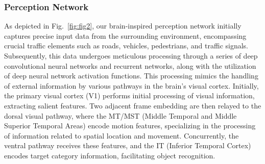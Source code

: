 \subsubsection{Perception Network}
\hspace{1pc}As depicted in Fig.~\ref{fig:fig2}, our brain-inspired perception network initially captures precise input data from the surrounding environment, encompassing crucial traffic elements such as roads, vehicles, pedestrians, and traffic signals. 
Subsequently, this data undergoes meticulous processing through a series of deep convolutional neural networks and recurrent networks, along with the utilization of deep neural network activation functions. 
This processing mimics the handling of external information by various pathways in the brain's visual cortex. 
Initially, the primary visual cortex (V1) performs initial processing of visual information, extracting salient features.
Two adjacent frame embedding are then relayed to the dorsal visual pathway, where the MT/MST (Middle Temporal and Middle Superior Temporal Areas) encode motion features, specializing in the processing of information related to spatial location and movement.
Concurrently, the ventral pathway receives these features, and the IT (Inferior Temporal Cortex) encodes target category information, facilitating object recognition. 


